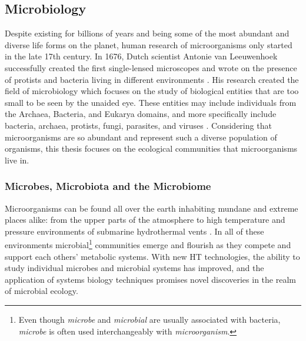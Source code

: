 \subsection{Microbiology}\label{intro-micro}
Despite existing for billions of years and being some of the most abundant and diverse life forms on the planet, human research of microorganisms only started in the late 17th century. In 1676, Dutch scientist Antonie van Leeuwenhoek successfully created the first single-lensed microscopes and wrote on the presence of protists and bacteria living in different environments \citep{Lane2015}. His research created the field of microbiology which focuses on the study of biological entities that are too small to be seen by the unaided eye. These entities may include individuals from the Archaea, Bacteria, and Eukarya domains, and more specifically include bacteria, archaea, protists, fungi, parasites, and viruses \citep{Sattley2015}. Considering that microorganisms are so abundant and represent such a diverse population of organisms,  this thesis focuses on the ecological communities that microorganisms live in.

\subsubsection{Microbes, Microbiota and the Microbiome}\label{intro-microbs}
Microorganisms can be found all over the earth inhabiting mundane and extreme places alike: from the upper parts of the atmosphere \citep{Fulton1966}
to high temperature and pressure environments of submarine hydrothermal vents \citep{Anderson2011}. In all of these environments microbial\footnote{Even though \textit{microbe} and \textit{microbial} are usually associated with bacteria, \textit{microbe} is often used interchangeably with \textit{microorganism}.} communities emerge and flourish as they compete and support each others' metabolic systems. With new \acrshort{HT} technologies, the ability to study individual microbes and microbial systems has improved, and the application of systems biology techniques promises novel discoveries in the realm of microbial ecology.


